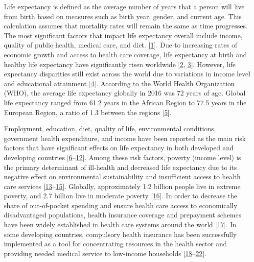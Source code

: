 \documentclass[]{elsarticle} %
\begin{document}
Life expectancy is defined as the average number of years that a person will live from birth based on measures such as birth year, gender, and current age. This calculation assumes that mortality rates will remain the same as time progresses. The most significant factors that impact life expectancy overall include income, quality of public health, medical care, and diet. {[}\protect\hyperlink{ref-Statista}{1}{]}.
Due to increasing rates of economic growth and access to health care coverage, life expectancy at birth and healthy life expectancy have significantly risen worldwide {[}\protect\hyperlink{ref-bor2013increases}{2}, \protect\hyperlink{ref-mathers2015causes}{3}{]}.
However, life expectancy disparities still exist across the world due to variations in income level and educational attainment {[}\protect\hyperlink{ref-world2018global}{4}{]}.
According to the World Health Organization (WHO), the average life expectancy globally in 2016 was 72 years of age. Global life expectancy ranged from 61.2 years in the African Region to 77.5 years in the European Region, a ratio of 1.3 between the regions {[}\protect\hyperlink{ref-WHOobserve}{5}{]}.

Employment, education, diet, quality of life, environmental conditions, government health expenditure, and income have been reported as the main risk factors that have significant effects on life expectancy in both developed and developing countries {[}\protect\hyperlink{ref-assari2018life}{6}--\protect\hyperlink{ref-wilkinson2018impact}{12}{]}.
Among these risk factors, poverty (income level) is the primary determinant of ill-health and decreased life expectancy due to its negative effect on environmental sustainability and insufficient access to health care services {[}\protect\hyperlink{ref-world2001dying}{13}--\protect\hyperlink{ref-rehm2018drinking}{15}{]}.
Globally, approximately 1.2 billion people live in extreme poverty, and 2.7 billion live in moderate poverty {[}\protect\hyperlink{ref-olinto2013state}{16}{]}.
In order to decrease the share of out-of-pocket spending and ensure health care access to economically disadvantaged populations, health insurance coverage and prepayment schemes have been widely established in health care systems around the world {[}\protect\hyperlink{ref-wagstaff2018progress}{17}{]}.
In some developing countries, compulsory health insurance has been successfully implemented as a tool for concentrating resources in the health sector and providing needed medical service to low-income households {[}\protect\hyperlink{ref-abel1992health}{18}--\protect\hyperlink{ref-meng2015consolidating}{22}{]}.
\end{document}
